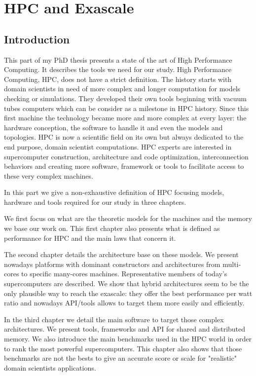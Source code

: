 \part{HPC and Exascale}
\chapter*{Introduction}

This part of my PhD thesis presents a state of the art of High Performance Computing.
It describes the tools we need for our study. 
High Performance Computing, HPC, does not have a strict definition. 
The history starts with domain scientists in need of more complex and longer computation for models checking or simulations. 
They developed their own tools beginning  with vacuum tubes computers which can be consider as a milestone in HPC history. 
Since this first machine the technology became more and more complex at every layer: the hardware conception, the software to handle it and even the models and topologies.
HPC is now a scientific field on its own but always dedicated to the end purpose, domain scientist computations. 
HPC experts are interested in supercomputer construction, architecture and code optimization, interconnection behaviors and creating more software, framework or tools to facilitate access to these very complex machines. 

In this part we give a non-exhaustive definition of HPC focusing models, hardware and tools required for our study in three chapters.

We first focus on what are the theoretic models for the machines and the memory we base our work on. 
This first chapter also presents what is defined as performance for HPC and the main laws that concern it. 

The second chapter details the architecture base on these models. 
We present nowadays platforms with dominant constructors and architectures from multi-cores to specific many-cores machines. 
Representative members of today's supercomputers are described.  
We show that hybrid architectures seem to be the only plausible way to reach the exascale: they offer the best performance per watt ratio and nowadays API/tools allows to target them more easily and efficiently.  

In the third chapter we detail the main software to target those complex architectures. 
We present tools, frameworks and API for shared and distributed memory. 
We also introduce the main benchmarks used in the HPC world in order to rank the most powerful supercomputers. 
This chapter also shows that those benchmarks are not the bests to give an accurate score or scale for "realistic" domain scientists applications.


